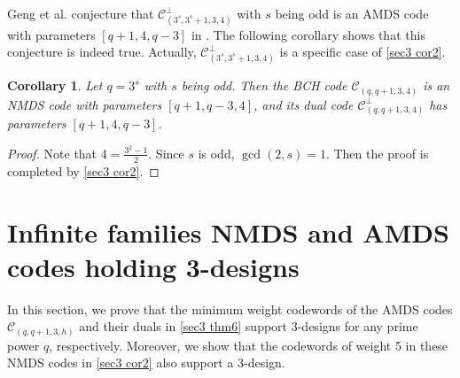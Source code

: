 \documentclass[sn-mathphys-num]{sn-jnl}%
\theoremstyle{thmstyleone}%
\newtheorem{corollary}{Corollary}
\theoremstyle{thmstyletwo}%
\theoremstyle{thmstylethree}%
\begin{document}
Geng et al. conjecture that $\mathcal{C}^\perp_{(3^s,3^s+1,3,4)}$ with $s$ being odd is an AMDS code with parameters $[q+1,4,q-3]$ in \cite[Conjecture 3.6]{Geng2022ClassAlmostMDS}. The following corollary shows that this conjecture is indeed true. Actually, $\mathcal{C}^\perp_{(3^s,3^s+1,3,4)}$ is a specific case of \cref{sec3 cor2}. 
\begin{corollary}
	\label{sec3 cor3}
	Let $q=3^s$ with $s$ being odd. Then the BCH code $\mathcal{C}_{(q,q+1,3,4)}$ is an NMDS code with parameters $[q+1,q-3,4]$, and its dual code $\mathcal{C}^\perp_{(q,q+1,3,4)}$ has parameters $[q+1,4,q-3]$.
\end{corollary}
\begin{proof}
	Note that $4=\frac{3^2-1}{2}$. Since $s$ is odd, $\gcd(2,s)=1$. Then the proof is completed by \cref{sec3 cor2}.
\end{proof}

\section{Infinite families NMDS and AMDS codes holding 3-designs}\label{sec4}
In this section, we prove that the minimum weight codewords of the AMDS codes $\mathcal{C}_{(q,q+1,3,h)}$ and their duals in \cref{sec3 thm6} support $3$-designs for any prime power $q$, respectively. Moreover, we show that the codewords of weight 5 in these NMDS codes in \cref{sec3 cor2} also support a $3$-design.
\end{document}
